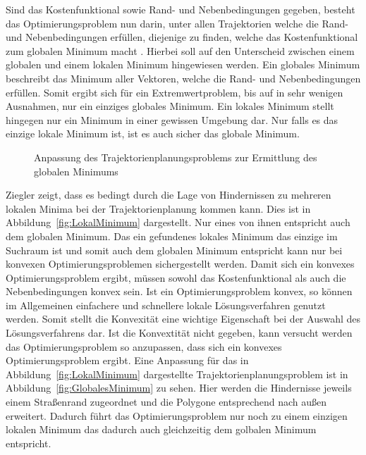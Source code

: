 Sind das Kostenfunktional sowie Rand- und Nebenbedingungen gegeben, besteht das Optimierungsproblem nun darin, unter allen Trajektorien welche die Rand- und Nebenbedingungen erf\"ullen, diejenige zu finden, welche das Kostenfunktional zum globalen Minimum macht \cite{Follinger1988}.
Hierbei soll auf den Unterscheid zwischen einem globalen und einem lokalen Minimum hingewiesen werden.
Ein globales Minimum beschreibt das Minimum aller Vektoren, welche die Rand- und Nebenbedingungen erf\"ullen. 
Somit ergibt sich f\"ur ein Extremwertproblem, bis auf in sehr wenigen Ausnahmen, nur ein einziges globales Minimum. 
Ein lokales Minimum stellt hingegen nur ein Minimum in einer gewissen Umgebung dar. 
Nur falls es das einzige lokale Minimum ist, ist es auch sicher das globale Minimum. \cite{Follinger1988}


\begin{figure}[!htbp]
    \centering
    \hfill
    \caption[Anpassung f\"ur globales Minimum]{Anpassung des Trajektorienplanungsproblems zur Ermittlung des globalen Minimums}
    \label{fig:GlobalMinAdaption}
\end{figure}


Ziegler \cite{Ziegler2017} zeigt, dass es bedingt durch die Lage von Hindernissen zu mehreren lokalen Minima bei der Trajektorienplanung kommen kann. 
Dies ist in Abbildung~\ref{fig:LokalMinimum} dargestellt.
Nur eines von ihnen entspricht auch dem globalen Minimum.
Das ein gefundenes lokales Minimum das einzige im Suchraum ist und somit auch dem globalen Minimum entspricht kann nur bei konvexen Optimierungsproblemen sichergestellt werden.
Damit sich ein konvexes Optimierungsproblem ergibt, m\"ussen sowohl das Kostenfunktional als auch die Nebenbedingungen konvex sein. 
Ist ein Optimierungsproblem konvex, so k\"onnen im Allgemeinen einfachere und schnellere lokale L\"osungsverfahren genutzt werden. \cite{Graichen2012}
Somit stellt die Konvexit\"at eine wichtige Eigenschaft bei der Auswahl des L\"osungsverfahrens dar. 
Ist die Konvextit\"at nicht gegeben, kann versucht werden das Optimierungsproblem so anzupassen, dass sich ein konvexes Optimierungsproblem ergibt.
Eine Anpassung f\"ur das in Abbildung~\ref{fig:LokalMinimum} dargestellte Trajektorienplanungsproblem ist in Abbildung~\ref{fig:GlobalesMinimum} zu sehen.
Hier werden die Hindernisse jeweils einem Stra{\ss}enrand zugeordnet und die Polygone entsprechend nach au{\ss}en erweitert.
Dadurch f\"uhrt das Optimierungsproblem nur noch zu einem einzigen lokalen Minimum das dadurch auch gleichzeitig dem golbalen Minimum entspricht.

